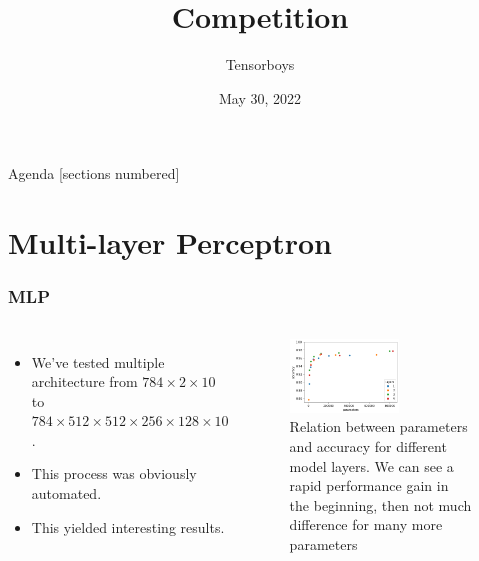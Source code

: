 \documentclass[aspectratio=169]{beamer}
\title{Competition}
\date{May 30, 2022}
\author{Tensorboys}
\institute{Pattern Recognition}
\begin{document}
\maketitle

\begin{frame}{Agenda}
    [sections numbered]
    \tableofcontents
\end{frame}
\section{Multi-layer Perceptron}
\begin{frame}[t]
    \frametitle{MLP}
    \begin{columns}
        \begin{itemize}
            \item We've tested multiple architecture from $784\times 2 \times 10$ to $784\times 512 \times 512\times 256 \times 128 \times 10$.
            \item This process was obviously automated.
            \item This yielded interesting results.
        \end{itemize}
        \begin{figure}[ht!]
            \centering
            \includegraphics[width=0.6\textwidth]{figures/mlp_layers_global.png}
            \caption{Relation between parameters and accuracy for different model layers. We can see a rapid performance gain in the beginning, then not much difference for many more parameters }
            \label{fig:mlp}
        \end{figure}
    \end{columns}
\end{frame}
\end{document}
